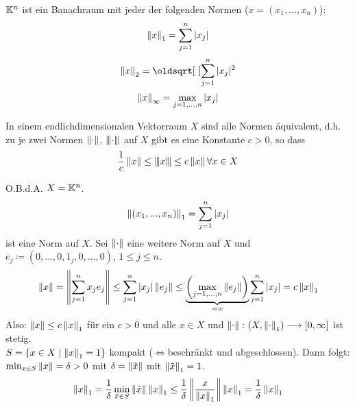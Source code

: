 \begin{beispiel*}
$ \mathbb{K}^n $ ist ein Banachraum mit jeder der folgenden Normen ($ x=(x_1,...,x_n) $):
\[ \left\|x\right\|_1=\sum_{j=1}^{n} |x_j| \]
\[ \norm{x}_2=\sqrt{\sum_{j=1}^{n}|x_j|^2} \]
\[ \left\|x\right\|_\infty=\max_{j=1,...,n}|x_j| \]
\end{beispiel*}
\begin{proposition}
In einem endlichdimensionalen Vektorraum $ X $ sind alle Normen \"aquivalent, d.h. zu je zwei Normen $ \left\|\cdot\right\| $, $ {\left\vert\kern-0.25ex\left\vert\kern-0.25ex\left\vert \cdot \right\vert\kern-0.25ex\right\vert\kern-0.25ex\right\vert}$ auf $ X $ gibt es eine Konstante $ c>0 $, so dass
\[ \frac{1}{c}\left\|x\right\|\leq{\left\vert\kern-0.25ex\left\vert\kern-0.25ex\left\vert x \right\vert\kern-0.25ex\right\vert\kern-0.25ex\right\vert}\leq c\left\|x\right\|\forall x\in X \]
\end{proposition}
\newpage
\begin{beweis}
O.B.d.A. $ X=\mathbb{K}^n $.
\[ \left\|(x_1,...,x_n)\right\|_1=\sum_{j=1}^{n}|x_j| \]
ist eine Norm auf $ X $. Sei $ \left\|\cdot\right\| $ eine weitere Norm auf $ X $ und $ e_j\coloneqq (0,...,0,1_j,0,...,0) $, $ 1\leq j\leq n $.
\[ \left\|x\right\|=\left\|\sum_{j=1}^{n}x_je_j\right\|\leq\sum_{j=1}^{n}|x_j|\left\|e_j\right\|\leq\underbrace{\left(\max_{j=1,...,n}\left\|e_j\right\|\right)}_{\eqqcolon c}\sum_{j=1}^{n}|x_j|=c\left\|x\right\|_1 \]
Also: $ \left\|x\right\|\leq c\left\|x\right\|_1 $ f\"ur ein $ c>0 $ und alle $ x\in X $ und $ \left\|\cdot\right\|\colon (X,\left\|\cdot\right\|_1)\longrightarrow[0,\infty] $ ist stetig.\\
$ S=\lbrace x\in X\mid\left\|x\right\|_1=1\rbrace $ kompakt ($ \Leftrightarrow $beschr\"ankt und abgeschlossen). Dann folgt: $ \min_{x\in S}\left\|x\right\|=\delta>0 $ mit $ \delta=\left\|\tilde{x}\right\| $ mit $ \left\|\tilde{x}\right\|_1=1 $.
\[ \left\|x\right\|_1=\frac{1}{\delta}\min_{\tilde{x}\in S}\left\|\tilde{x}\right\|\left\|x\right\|_1\leq\frac{1}{\delta}\left\|\frac{x}{\left\|x\right\|_1}\right\|\left\|x\right\|_1=\frac{1}{\delta}\left\|x\right\|_1 \]
\end{beweis}
